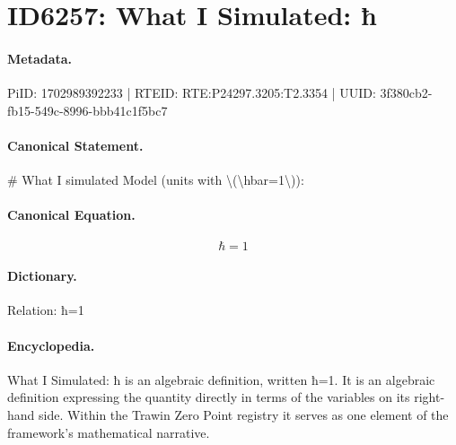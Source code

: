 \section*{ID6257: What I Simulated: ħ}
\paragraph{Metadata.}
PiID: 1702989392233 | RTEID: RTE:P24297.3205:T2.3354 | UUID: 3f380cb2-fb15-549c-8996-bbb41c1f5bc7

\paragraph{Canonical Statement.}
\# What I simulated Model (units with \textbackslash{}(\textbackslash{}hbar=1\textbackslash{})):

\paragraph{Canonical Equation.}
\[
\hbar=1
\]

\paragraph{Dictionary.}
Relation: ħ=1

\paragraph{Encyclopedia.}
What I Simulated: ħ is an algebraic definition, written ħ=1. It is an algebraic definition expressing the quantity directly in terms of the variables on its right-hand side. Within the Trawin Zero Point registry it serves as one element of the framework's mathematical narrative.
